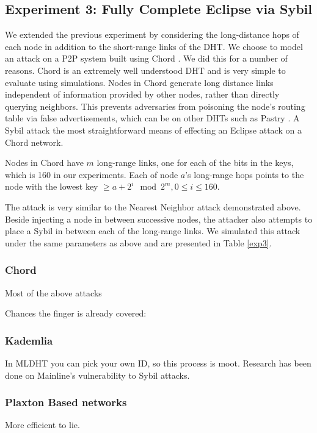 \documentclass[a4paper]{article}
\begin{document}
\subsection{Experiment 3: Fully Complete Eclipse via Sybil}
We extended the previous experiment by considering the long-distance hops of each node in addition to the short-range links of the DHT.
We choose to model an attack on a P2P system built using Chord \cite{chord}.
We did this for a number of reasons.
Chord is an extremely well understood DHT and is very simple to evaluate using simulations.
Nodes in Chord generate long distance links independent of information provided by other nodes, rather than directly querying neighbors.
This prevents adversaries from poisoning the node's routing table via false advertisements, which can be on other DHTs such as Pastry \cite{pastry}. 
A Sybil attack the most straightforward means of effecting an Eclipse attack on a Chord network.

Nodes in Chord have $m$ long-range links, one for each of the bits in the keys, which is 160 in our experiments.
Each of node $a$'s long-range hops points to the node with the lowest key $\geq a + 2^{i} \mod 2^{m} , 0 \leq i \leq 160$.


The attack is very similar to the Nearest Neighbor attack demonstrated above.
Beside injecting a node in between successive nodes, the attacker also attempts to place a Sybil in between each of the long-range links.
We simulated this attack under the same parameters as above and are presented in Table \ref{exp3}.








\subsubsection{Chord}
Most of the above attacks



Chances the finger is already covered:

\subsubsection{Kademlia}
In MLDHT you can pick your own ID, so this process is moot.
Research has been done on Mainline's  vulnerability to Sybil attacks.

\subsubsection{Plaxton Based networks}
More efficient to lie.
\end{document}
